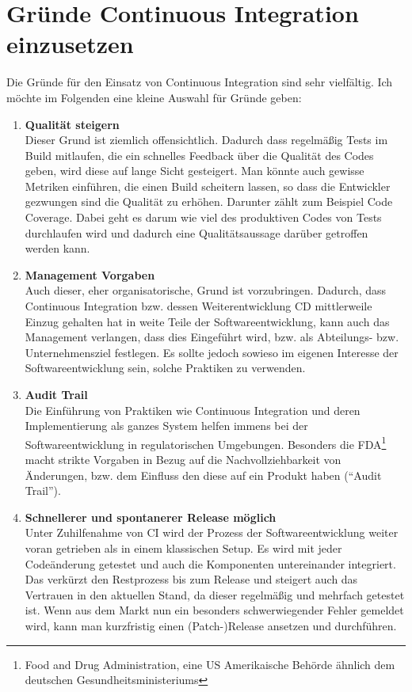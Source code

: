 \section{Gründe Continuous Integration einzusetzen}
Die Gründe für den Einsatz von Continuous Integration sind sehr vielfältig. Ich möchte im Folgenden eine kleine Auswahl für Gründe geben:
\begin{enumerate}
	\item \textbf{Qualität steigern}\\
	Dieser Grund ist ziemlich offensichtlich. Dadurch dass regelmäßig Tests im Build mitlaufen, die ein schnelles Feedback über die Qualität des Codes geben, wird diese auf lange Sicht gesteigert. Man könnte auch gewisse Metriken einführen, die einen Build scheitern lassen, so dass die Entwickler gezwungen sind die Qualität zu erhöhen. Darunter zählt zum Beispiel Code Coverage. Dabei geht es darum wie viel des produktiven Codes von Tests durchlaufen wird und dadurch eine Qualitätsaussage darüber getroffen werden kann.
	\item \textbf{Management Vorgaben}\\
	Auch dieser, eher organisatorische, Grund ist vorzubringen. Dadurch, dass Continuous Integration bzw. dessen Weiterentwicklung CD mittlerweile Einzug gehalten hat in weite Teile der Softwareentwicklung, kann auch das Management verlangen, dass dies Eingeführt wird, bzw. als Abteilungs- bzw. Unternehmensziel festlegen. Es sollte jedoch sowieso im eigenen Interesse der Softwareentwicklung sein, solche Praktiken zu verwenden.
	\item \textbf{Audit Trail}\\
	Die Einführung von Praktiken wie Continuous Integration und deren Implementierung als ganzes System helfen immens bei der Softwareentwicklung in regulatorischen Umgebungen. Besonders die FDA\footnote{Food and Drug Administration, eine US Amerikaische Behörde ähnlich dem deutschen Gesundheitsministeriums} macht strikte Vorgaben in Bezug auf die Nachvollziehbarkeit von Änderungen, bzw. dem Einfluss den diese auf ein Produkt haben ("`Audit Trail"').
	\item \textbf{Schnellerer und spontanerer Release möglich}\\
	Unter Zuhilfenahme von CI wird der Prozess der Softwareentwicklung weiter voran getrieben als in einem klassischen Setup. Es wird mit jeder Codeänderung getestet und auch die Komponenten untereinander integriert. Das verkürzt den Restprozess bis zum Release und steigert auch das Vertrauen in den aktuellen Stand, da dieser regelmäßig und mehrfach getestet ist. Wenn aus dem Markt nun ein besonders schwerwiegender Fehler gemeldet wird, kann man kurzfristig einen (Patch-)Release ansetzen und durchführen.

\end{enumerate}
